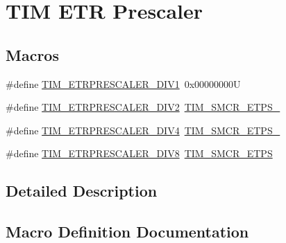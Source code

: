 \hypertarget{group___t_i_m___e_t_r___prescaler}{}\section{T\+IM E\+TR Prescaler}
\label{group___t_i_m___e_t_r___prescaler}
\subsection*{Macros}
\begin{DoxyCompactItemize}
\item 
\#define \mbox{\hyperlink{group___t_i_m___e_t_r___prescaler_gabead5364c62645592e42545ba09ab88a}{T\+I\+M\+\_\+\+E\+T\+R\+P\+R\+E\+S\+C\+A\+L\+E\+R\+\_\+\+D\+I\+V1}}~0x00000000U
\item 
\#define \mbox{\hyperlink{group___t_i_m___e_t_r___prescaler_gaf7fe49f67bdb6b33b9b41953fee75680}{T\+I\+M\+\_\+\+E\+T\+R\+P\+R\+E\+S\+C\+A\+L\+E\+R\+\_\+\+D\+I\+V2}}~\mbox{\hyperlink{group___peripheral___registers___bits___definition_ga00b43cd09557a69ed10471ed76b228d8}{T\+I\+M\+\_\+\+S\+M\+C\+R\+\_\+\+E\+T\+P\+S\+\_}}
\item 
\#define \mbox{\hyperlink{group___t_i_m___e_t_r___prescaler_gaa09da30c3cd28f1fe6b6f3f599a5212c}{T\+I\+M\+\_\+\+E\+T\+R\+P\+R\+E\+S\+C\+A\+L\+E\+R\+\_\+\+D\+I\+V4}}~\mbox{\hyperlink{group___peripheral___registers___bits___definition_gabf12f04862dbc92ca238d1518b27b16b}{T\+I\+M\+\_\+\+S\+M\+C\+R\+\_\+\+E\+T\+P\+S\+\_}}
\item 
\#define \mbox{\hyperlink{group___t_i_m___e_t_r___prescaler_ga834e38200874cced108379b17a24d0b7}{T\+I\+M\+\_\+\+E\+T\+R\+P\+R\+E\+S\+C\+A\+L\+E\+R\+\_\+\+D\+I\+V8}}~\mbox{\hyperlink{group___peripheral___registers___bits___definition_ga0ebb9e631876435e276211d88e797386}{T\+I\+M\+\_\+\+S\+M\+C\+R\+\_\+\+E\+T\+PS}}
\end{DoxyCompactItemize}


\subsection{Detailed Description}


\subsection{Macro Definition Documentation}
\mbox{\label{group___t_i_m___e_t_r___prescaler_gabead5364c62645592e42545ba09ab88a}} 
